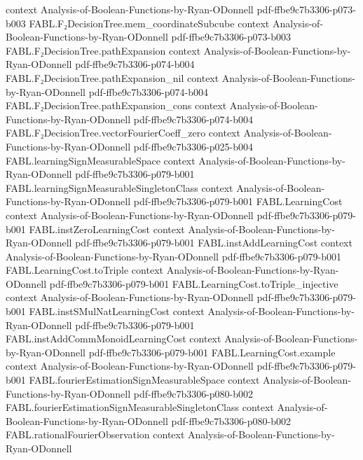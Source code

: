 \begin{theorem}
  {context}
  {Analysis-of-Boolean-Functions-by-Ryan-ODonnell}
  {pdf-ffbe9c7b3306-p073-b003}
\proofstep
  {FABL.F₂DecisionTree.mem_coordinateSubcube}
  {context}
  {Analysis-of-Boolean-Functions-by-Ryan-ODonnell}
  {pdf-ffbe9c7b3306-p073-b003}
\proofstep
  {FABL.F₂DecisionTree.pathExpansion}
  {context}
  {Analysis-of-Boolean-Functions-by-Ryan-ODonnell}
  {pdf-ffbe9c7b3306-p074-b004}
\proofstep
  {FABL.F₂DecisionTree.pathExpansion_nil}
  {context}
  {Analysis-of-Boolean-Functions-by-Ryan-ODonnell}
  {pdf-ffbe9c7b3306-p074-b004}
\proofstep
  {FABL.F₂DecisionTree.pathExpansion_cons}
  {context}
  {Analysis-of-Boolean-Functions-by-Ryan-ODonnell}
  {pdf-ffbe9c7b3306-p074-b004}
\proofstep
  {FABL.F₂DecisionTree.vectorFourierCoeff_zero}
  {context}
  {Analysis-of-Boolean-Functions-by-Ryan-ODonnell}
  {pdf-ffbe9c7b3306-p025-b004}
\proofstep
  {FABL.learningSignMeasurableSpace}
  {context}
  {Analysis-of-Boolean-Functions-by-Ryan-ODonnell}
  {pdf-ffbe9c7b3306-p079-b001}
\proofstep
  {FABL.learningSignMeasurableSingletonClass}
  {context}
  {Analysis-of-Boolean-Functions-by-Ryan-ODonnell}
  {pdf-ffbe9c7b3306-p079-b001}
\proofstep
  {FABL.LearningCost}
  {context}
  {Analysis-of-Boolean-Functions-by-Ryan-ODonnell}
  {pdf-ffbe9c7b3306-p079-b001}
\proofstep
  {FABL.instZeroLearningCost}
  {context}
  {Analysis-of-Boolean-Functions-by-Ryan-ODonnell}
  {pdf-ffbe9c7b3306-p079-b001}
\proofstep
  {FABL.instAddLearningCost}
  {context}
  {Analysis-of-Boolean-Functions-by-Ryan-ODonnell}
  {pdf-ffbe9c7b3306-p079-b001}
\proofstep
  {FABL.LearningCost.toTriple}
  {context}
  {Analysis-of-Boolean-Functions-by-Ryan-ODonnell}
  {pdf-ffbe9c7b3306-p079-b001}
\proofstep
  {FABL.LearningCost.toTriple_injective}
  {context}
  {Analysis-of-Boolean-Functions-by-Ryan-ODonnell}
  {pdf-ffbe9c7b3306-p079-b001}
\proofstep
  {FABL.instSMulNatLearningCost}
  {context}
  {Analysis-of-Boolean-Functions-by-Ryan-ODonnell}
  {pdf-ffbe9c7b3306-p079-b001}
\proofstep
  {FABL.instAddCommMonoidLearningCost}
  {context}
  {Analysis-of-Boolean-Functions-by-Ryan-ODonnell}
  {pdf-ffbe9c7b3306-p079-b001}
\proofstep
  {FABL.LearningCost.example}
  {context}
  {Analysis-of-Boolean-Functions-by-Ryan-ODonnell}
  {pdf-ffbe9c7b3306-p079-b001}
\proofstep
  {FABL.fourierEstimationSignMeasurableSpace}
  {context}
  {Analysis-of-Boolean-Functions-by-Ryan-ODonnell}
  {pdf-ffbe9c7b3306-p080-b002}
\proofstep
  {FABL.fourierEstimationSignMeasurableSingletonClass}
  {context}
  {Analysis-of-Boolean-Functions-by-Ryan-ODonnell}
  {pdf-ffbe9c7b3306-p080-b002}
\proofstep
  {FABL.rationalFourierObservation}
  {context}
  {Analysis-of-Boolean-Functions-by-Ryan-ODonnell}

\end{theorem}
